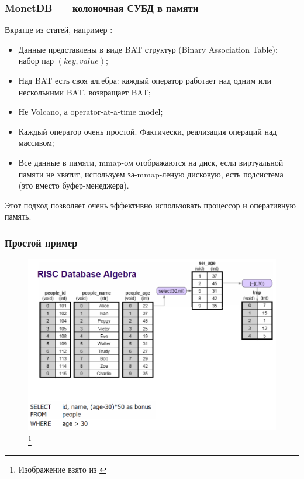 \documentclass{beamer}
\begin{document}
\begin{frame}
\frametitle{MonetDB~--- колоночная СУБД в памяти}

Вкратце из статей, например \cite{Boncz1999, Boncz2008}:

\begin{itemize}
	\item Данные представлены в виде BAT структур (Binary Association Table): набор пар $(key, value)$;
	\item Над BAT есть своя алгебра: каждый оператор работает над одним или несколькими BAT, возвращает BAT;
	\item Не Volcano, а operator-at-a-time model;
	\item Каждый оператор очень простой. Фактически, реализация операций над массивом;
	\item Все данные в памяти, mmap-ом отображаются на диск, если виртуальной памяти не хватит, используем за-mmap-леную дисковую, есть подсистема (это вместо буфер-менеджера).	
\end{itemize}

Этот подход позволяет очень эффективно использовать процессор и оперативную память.

\end{frame}

\begin{frame}
\frametitle{Простой пример}

\begin{figure}[htb]
	\includegraphics[width=\textwidth,height=0.750\textheight,keepaspectratio]{example.png} 
	\footnote{\tiny{Изображение взято из \cite{Harizopoulos2009}}}
\end{figure}    

\end{frame}
\end{document}
